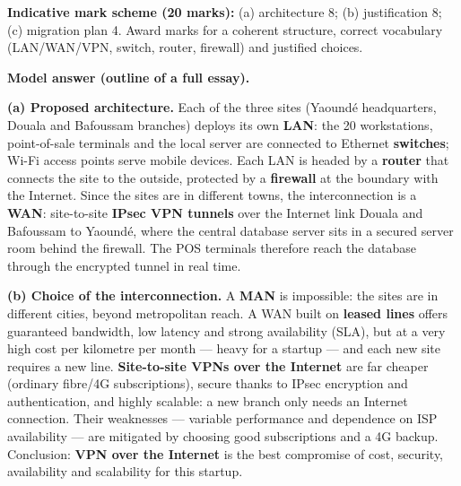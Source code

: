 \documentclass[11pt]{article}
\begin{document}
\begin{corrige}
\textbf{Indicative mark scheme (20 marks):} (a) architecture 8; (b) justification 8; (c) migration plan 4. Award marks for a coherent structure, correct vocabulary (LAN/WAN/VPN, switch, router, firewall) and justified choices.

\textbf{Model answer (outline of a full essay).}

\textbf{(a) Proposed architecture.} Each of the three sites (Yaoundé headquarters, Douala and Bafoussam branches) deploys its own \textbf{LAN}: the 20 workstations, point-of-sale terminals and the local server are connected to Ethernet \textbf{switches}; Wi-Fi access points serve mobile devices. Each LAN is headed by a \textbf{router} that connects the site to the outside, protected by a \textbf{firewall} at the boundary with the Internet. Since the sites are in different towns, the interconnection is a \textbf{WAN}: site-to-site \textbf{IPsec VPN tunnels} over the Internet link Douala and Bafoussam to Yaoundé, where the central database server sits in a secured server room behind the firewall. The POS terminals therefore reach the database through the encrypted tunnel in real time.

\textbf{(b) Choice of the interconnection.} A \textbf{MAN} is impossible: the sites are in different cities, beyond metropolitan reach. A WAN built on \textbf{leased lines} offers guaranteed bandwidth, low latency and strong availability (SLA), but at a very high cost per kilometre per month — heavy for a startup — and each new site requires a new line. \textbf{Site-to-site VPNs over the Internet} are far cheaper (ordinary fibre/4G subscriptions), secure thanks to IPsec encryption and authentication, and highly scalable: a new branch only needs an Internet connection. Their weaknesses — variable performance and dependence on ISP availability — are mitigated by choosing good subscriptions and a 4G backup. Conclusion: \textbf{VPN over the Internet} is the best compromise of cost, security, availability and scalability for this startup.


\end{corrige}
\end{document}
